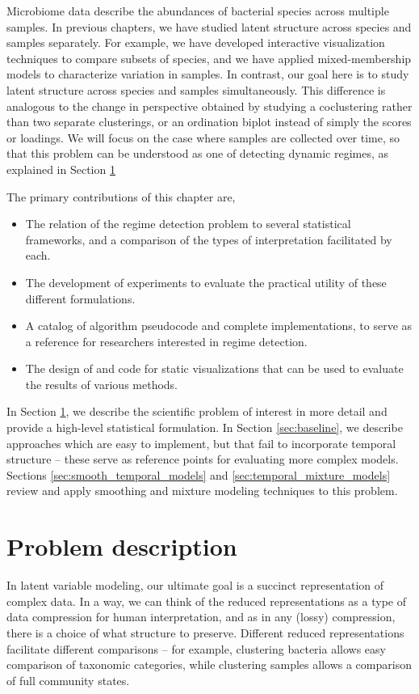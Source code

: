 Microbiome data describe the abundances of bacterial species across multiple
samples. In previous chapters, we have studied latent structure across species
and samples separately. For example, we have developed interactive visualization
techniques to compare subsets of species, and we have applied mixed-membership
models to characterize variation in samples. In contrast, our goal here is to
study latent structure across species and samples simultaneously. This
difference is analogous to the change in perspective obtained by studying a
coclustering rather than two separate clusterings, or an ordination biplot
instead of simply the scores or loadings. We will focus on the case where
samples are collected over time, so that this problem can be understood as one
of detecting dynamic regimes, as explained in Section
\ref{sec:problem_description}

The primary contributions of this chapter are,
\begin{itemize}
\item The relation of the regime detection problem to several statistical
  frameworks, and a comparison of the types of interpretation facilitated by
  each.
\item The development of experiments to evaluate the practical utility of these
  different formulations.
\item A catalog of algorithm pseudocode and complete implementations, to serve as a
  reference for researchers interested in regime detection.
\item The design of and code for static visualizations that can be used to
  evaluate the results of various methods.
\end{itemize}

In Section \ref{sec:problem_description}, we describe the scientific problem of
interest in more detail and provide a high-level statistical formulation. In
Section \ref{sec:baseline}, we describe approaches which are easy to implement,
but that fail to incorporate temporal structure -- these serve as reference
points for evaluating more complex models. Sections
\ref{sec:smooth_temporal_models} and \ref{sec:temporal_mixture_models}
review and apply smoothing and mixture modeling techniques to this problem.

\section{Problem description}
\label{sec:problem_description}

In latent variable modeling, our ultimate goal is a succinct representation of
complex data. In a way, we can think of the reduced representations as a type of
data compression for human interpretation, and as in any (lossy) compression,
there is a choice of what structure to preserve. Different reduced
representations facilitate different comparisons -- for example, clustering
bacteria allows easy comparison of taxonomic categories, while clustering
samples allows a comparison of full community states.

